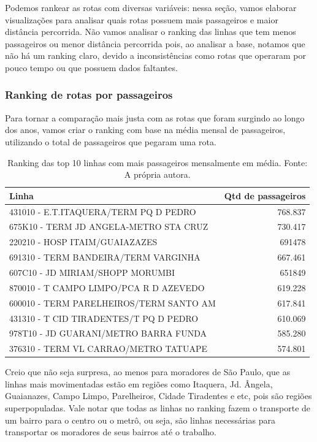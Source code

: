 Podemos rankear as rotas com diversas variáveis: nessa seção, vamos elaborar visualizações para analisar quais rotas possuem mais passageiros e maior distância percorrida. Não vamos analisar o ranking das linhas que tem menos passageiros ou menor distância percorrida pois, ao analisar a base, notamos que não há um ranking claro, devido a inconsistências como rotas que operaram por pouco tempo ou que possuem dados faltantes.

\subsubsection{Ranking de rotas por passageiros}

Para tornar a comparação mais justa com as rotas que foram surgindo ao longo dos anos, vamos criar o ranking com base na média mensal de passageiros, utilizando o total de passageiros que pegaram uma rota.

\begin{table}[H]
\centering
\begin{tabular}{lr}
\toprule
Linha & Qtd de passageiros \\
\midrule
431010 - E.T.ITAQUERA/TERM PQ D PEDRO   & 768.837 \\
675K10 - TERM JD ANGELA-METRO STA CRUZ & 730.417 \\
220210 - HOSP ITAIM/GUAIAZAZES & 691478 \\
691310 - TERM BANDEIRA/TERM VARGINHA & 667.461 \\
607C10 - JD MIRIAM/SHOPP MORUMBI & 651849 \\
870010 - T CAMPO LIMPO/PCA R D AZEVEDO  & 619.228 \\
600010 - TERM PARELHEIROS/TERM SANTO AM & 617.841 \\
431310 - T CID TIRADENTES/T PQ D PEDRO  & 610.069 \\
978T10 - JD GUARANI/METRO BARRA FUNDA & 585.280 \\
376310 - TERM VL CARRAO/METRO TATUAPE & 574.801 \\
\bottomrule
\end{tabular}
\caption{Ranking das top 10 linhas com mais passageiros mensalmente em média. Fonte: A própria autora.}
\label{tab:distancias_rotas}
\end{table}

Creio que não seja surpresa, ao menos para moradores de São Paulo, que as linhas mais movimentadas estão em regiões como Itaquera, Jd. Ângela, Guaianazes, Campo Limpo, Parelheiros, Cidade Tiradentes e etc, pois são regiões superpopuladas. Vale notar que todas as linhas no ranking fazem o transporte de um bairro para o centro ou o metrô, ou seja, são linhas necessárias para transportar os moradores de seus bairros até o trabalho.

